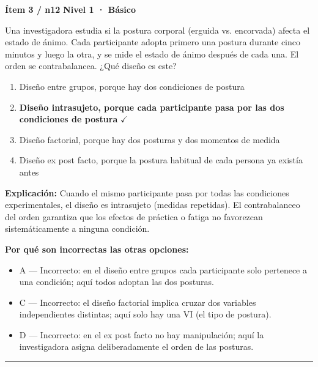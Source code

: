 \documentclass[12pt,a4paper]{article}
\begin{document}
\begin{mdframed}[backgroundcolor=fondogris,linecolor=azul,linewidth=1pt,innerleftmargin=10pt,innerrightmargin=10pt,innertopmargin=7pt,innerbottommargin=7pt]
\textbf{Ítem 3 / n12} \hfill {\small\bfseries\color{azul} Nivel 1 · Básico}
\end{mdframed}

Una investigadora estudia si la postura corporal (erguida vs. encorvada) afecta el estado de ánimo. Cada participante adopta primero una postura durante cinco minutos y luego la otra, y se mide el estado de ánimo después de cada una. El orden se contrabalancea. ¿Qué diseño es este?

\begin{enumerate}
  \item[A.] Diseño entre grupos, porque hay dos condiciones de postura
  \item[\textbf{\color{verde}B.}] \textbf{\color{verde} Diseño intrasujeto, porque cada participante pasa por las dos condiciones de postura} \hfill $\checkmark$
  \item[C.] Diseño factorial, porque hay dos posturas y dos momentos de medida
  \item[D.] Diseño ex post facto, porque la postura habitual de cada persona ya existía antes
\end{enumerate}

\noindent\textbf{\color{azul}Explicación:} Cuando el mismo participante pasa por todas las condiciones experimentales, el diseño es intrasujeto (medidas repetidas). El contrabalanceo del orden garantiza que los efectos de práctica o fatiga no favorezcan sistemáticamente a ninguna condición.

\noindent\textbf{\color{gris}Por qué son incorrectas las otras opciones:}
\begin{itemize}
  \item {\small A — Incorrecto: en el diseño entre grupos cada participante solo pertenece a una condición; aquí todos adoptan las dos posturas.}
  \item {\small C — Incorrecto: el diseño factorial implica cruzar dos variables independientes distintas; aquí solo hay una VI (el tipo de postura).}
  \item {\small D — Incorrecto: en el ex post facto no hay manipulación; aquí la investigadora asigna deliberadamente el orden de las posturas.}
\end{itemize}
\vspace{8pt}\hrule\vspace{10pt}
\end{document}
